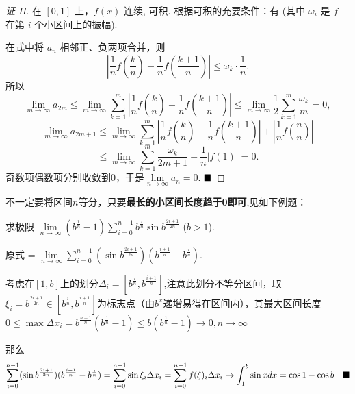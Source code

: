 \documentclass[lang=cn,newtx,10pt,scheme=chinese]{elegantbook}
\begin{document}
\begin{proof}[证 II]
在 $[0,1]$ 上，$f(x)$ 连续, 可积. 根据可积的充要条件：有  (其中 $\omega_i$ 是 $f$ 在第 $i$ 个小区间上的振幅).

在式中将 $a_n$ 相邻正、负两项合并，则
$$ \left| \frac{1}{n} f\left(\frac{k}{n}\right) - \frac{1}{n} f\left(\frac{k+1}{n}\right) \right| \le \omega_k \cdot \frac{1}{n}. $$
所以
$$ \lim_{m \to \infty} a_{2m} \le \lim_{m \to \infty} \sum_{k=1}^{m} \left| \frac{1}{n} f\left(\frac{k}{n}\right) - \frac{1}{n} f\left(\frac{k+1}{n}\right) \right| \le \lim_{m \to \infty} \frac{1}{2} \sum_{k=1}^{m} \frac{\omega_k}{m} = 0, $$
$$ \lim_{m \to \infty} a_{2m+1} \le \lim_{m \to \infty} \sum_{k=1}^{m} \left| \frac{1}{n} f\left(\frac{k}{n}\right) - \frac{1}{n} f\left(\frac{k+1}{n}\right) \right| + \left| \frac{1}{n} f\left(\frac{n}{n}\right) \right| $$
$$ \le \lim_{m \to \infty} \sum_{k=1}^{m} \frac{\omega_k}{2m+1} + \frac{1}{n} |f(1)| = 0. $$
奇数项偶数项分别收敛到0，于是$\lim\limits_{n \to \infty} a_n = 0$. $\hfill \blacksquare$
\end{proof}

\begin{remark}
不一定要将区间$n$等分，只要\textbf{最长的小区间长度趋于0即可},见如下例题：
\end{remark}

\begin{example}[（非n等分定积分定义求极限）]
    求极限 $\lim\limits_{n \to \infty} (b^{\frac{1}{n}} - 1) \sum\limits_{i=0}^{n-1} b^{\frac{i}{n}} \sin b^{\frac{2i+1}{2n}}$ ($b>1$).
\end{example}

\begin{solution}
原式 = $\lim\limits_{n \to \infty} \sum\limits_{i=0}^{n-1} (\sin b^{\frac{2i+1}{2n}}) (b^{\frac{i+1}{n}} - b^{\frac{i}{n}})$.

考虑在$[1,b]$上的划分$\Delta_i = [b^{\frac{i}{n}},b^{\frac{i+1}{n}}]$,注意此划分不等分区间，取$\xi_i=b^{\frac{2i+1}{2n}}\in[b^{\frac{i}{n}},b^{\frac{i+1}{n}}]$为标志点（由$b^x$递增易得在区间内），其最大区间长度$ 0\le\max {\Delta x_i} = b^{\frac{n-1}{n}}(b^{\frac{1}{n}}-1)\le b(b^{\frac{1}{n}}-1)\rightarrow 0,n\rightarrow\infty$

那么
$$
\sum\limits_{i=0}^{n-1} (\sin b^{\frac{2i+1}{2n}}) (b^{\frac{i+1}{n}} - b^{\frac{i}{n}}) = \sum\limits_{i=0}^{n-1} \sin \xi_i \Delta x_i =\sum\limits_{i=0}^{n-1} f(\xi)_i \Delta x_i \rightarrow \int_1^b \sin x dx = \cos 1 - \cos b  \quad \hfill \blacksquare 
$$
\end{solution}
\end{document}
